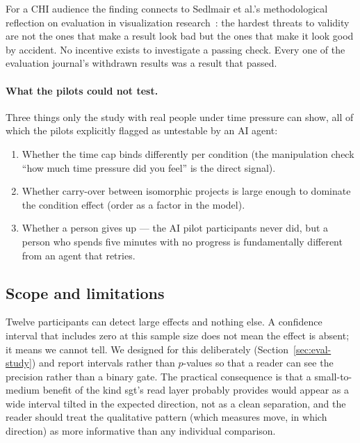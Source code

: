 For a CHI audience the finding connects to Sedlmair et al.'s methodological
reflection on evaluation in visualization research~\cite{sedlmair2012}: the
hardest threats to validity are not the ones that make a result look bad but
the ones that make it look good by accident. No incentive exists to
investigate a passing check. Every one of the evaluation journal's withdrawn
results was a result that passed.

\paragraph{What the pilots could not test.}
Three things only the study with real people under time pressure can show, all
of which the pilots explicitly flagged as untestable by an AI agent:
\begin{enumerate}
\item Whether the time cap binds differently per condition (the manipulation
  check ``how much time pressure did you feel'' is the direct signal).
\item Whether carry-over between isomorphic projects is large enough to
  dominate the condition effect (order as a factor in the model).
\item Whether a person gives up --- the AI pilot participants never did, but a
  person who spends five minutes with no progress is fundamentally different
  from an agent that retries.
\end{enumerate}

\subsection{Scope and limitations}

Twelve participants can detect large effects and nothing else. A confidence
interval that includes zero at this sample size does not mean the effect is
absent; it means we cannot tell. We designed for this deliberately
(Section~\ref{sec:eval-study}) and report intervals rather than $p$-values so
that a reader can see the precision rather than a binary gate. The practical
consequence is that a small-to-medium benefit of the kind sgt's read layer
probably provides would appear as a wide interval tilted in the expected
direction, not as a clean separation, and the reader should treat the
qualitative pattern (which measures move, in which direction) as more
informative than any individual comparison.

